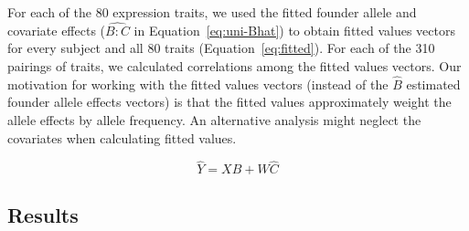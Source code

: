 \documentclass{book}
\begin{document}
For each of the 80 expression traits, we used the fitted founder allele and covariate effects ($\widehat{B:C}$ in Equation~\ref{eq:uni-Bhat}) to obtain fitted values vectors for every subject and all 80 traits (Equation~\ref{eq:fitted}). For each of the 310 pairings of traits, we calculated correlations among the fitted values vectors. Our motivation for working with the fitted values vectors (instead of the $\hat B$ estimated founder allele effects vectors) is that the fitted values approximately weight the allele effects by allele frequency. An alternative analysis might neglect the covariates when calculating fitted values.

\begin{equation}\label{eq:fitted}
\hat Y = X\hat B + W \hat C
\end{equation}


\subsection{Results}
\end{document}
